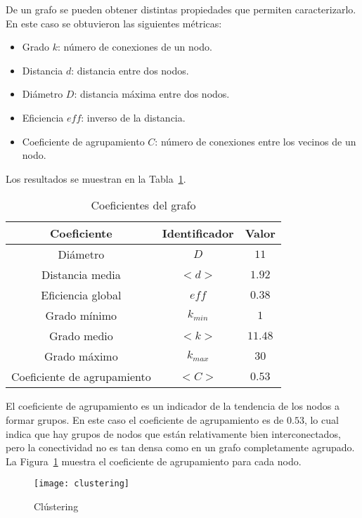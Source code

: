 \documentclass{article}
\begin{document}
De un grafo se pueden obtener distintas propiedades que permiten caracterizarlo.
En este caso se obtuvieron las siguientes métricas:
\begin{itemize}
  \item Grado $k$: número de conexiones de un nodo.
  \item Distancia $d$: distancia entre dos nodos.
  \item Diámetro $D$: distancia máxima entre dos nodos.
  \item Eficiencia $eff$: inverso de la distancia.
  \item Coeficiente de agrupamiento $C$: número de conexiones entre los vecinos de un nodo.
\end{itemize}

Los resultados se muestran en la Tabla~\ref{tab:coeficientes}.

\begin{table}[h!]
\begin{center}
\begin{tabular}{| c | c | c |}
  \hline
Coeficiente & Identificador & Valor \\ \hline
Diámetro & $D$ & $11$ \\
Distancia media & $<d>$ & $1.92$ \\
Eficiencia global & $eff$ & $0.38$\\
Grado mínimo & $k_{min}$ & $1$\\
Grado medio & $<k>$ & $11.48$\\
Grado máximo & $k_{max}$ & $30$\\
Coeficiente de agrupamiento & $<C>$ & $0.53$\\ \hline
\end{tabular}
\caption{Coeficientes del grafo}
\label{tab:coeficientes}
\end{center}
\end{table}

El coeficiente de agrupamiento es un indicador de la tendencia de los nodos a formar grupos.
En este caso el coeficiente de agrupamiento es de $0.53$, lo cual indica que hay grupos de nodos que están relativamente bien interconectados, pero la conectividad no es tan densa como en un grafo completamente agrupado.
La Figura~\ref{fig:coeficiente_agrupamiento} muestra el coeficiente de agrupamiento para cada nodo.


\begin{figure}[h!]
    \centering
      \texttt{[image: clustering]}
      \caption{Clústering}
  \label{fig:coeficiente_agrupamiento}
\end{figure}
\end{document}
